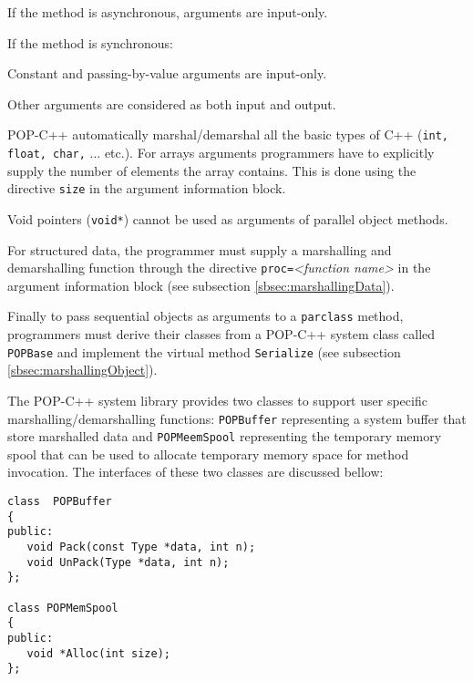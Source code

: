\begin{petitem}

    \item If the method is asynchronous, arguments are input-only.

    \item If the method is synchronous:

	\begin{petitem}

	    \item Constant and passing-by-value arguments are
		input-only.

	    \item Other arguments are considered as both
		input and output.

	\end{petitem}

\end{petitem}


POP-C++ automatically marshal/demarshal all the basic types of C++
(\texttt{int, float, char,} ... etc.). For arrays arguments programmers
have to explicitly supply the number of elements the array contains.
This is done using the directive \texttt{size} in the argument
information block.
 
Void pointers (\texttt{void*}) cannot be used as arguments of parallel object methods.

For structured data, the programmer must supply a marshalling and
demarshalling function through the directive \texttt{proc=}\emph{<function
name>} in the argument information block (see subsection \ref{sbsec:marshallingData}).

Finally to pass sequential objects as arguments to a \texttt{parclass} method,
programmers must derive their classes from a POP-C++ system class called
\texttt{POPBase} and implement the virtual method \texttt{Serialize} (see
subsection \ref{sbsec:marshallingObject}).

The POP-C++ system library provides two classes to support user specific
marshalling/demarshalling functions: \texttt{POPBuffer} representing a
system buffer that store marshalled data and \texttt{POPMeemSpool}
representing the temporary memory spool that can be used to allocate
temporary memory space for method invocation. The interfaces of these
two classes are discussed bellow:

\begin{verbatim}
class  POPBuffer
{
public:
   void Pack(const Type *data, int n);
   void UnPack(Type *data, int n);
};

class POPMemSpool
{
public:
   void *Alloc(int size);
};

\end{verbatim}


